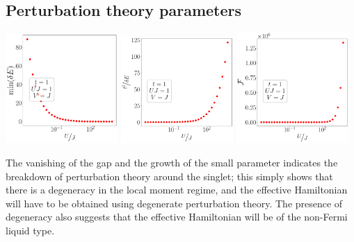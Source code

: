 \documentclass{report}
\numberwithin{equation}{section}
\begin{document}
\subsection*{Perturbation theory parameters}
\begin{center}
	\includegraphics[width=0.32\textwidth]{../figures/gap-t=1.000,J=1_over_U,V=J,N=6,U=0.016,91.116,32.pdf}
	\includegraphics[width=0.32\textwidth]{../figures/par-t=1.000,J=1_over_U,V=J,N=6,U=0.016,91.116,32.pdf}
	\includegraphics[width=0.32\textwidth]{../figures/lfl-t=1.000,J=1_over_U,V=J,N=6,U=0.016,91.116,32.pdf}
\end{center}
The vanishing of the gap and the growth of the small parameter indicates the breakdown of perturbation theory around the singlet; this simply shows that there is a degeneracy in the local moment regime, and the effective Hamiltonian will have to be obtained using degenerate perturbation theory. The presence of degeneracy also suggests that the effective Hamiltonian will be of the non-Fermi liquid type.
\end{document}
